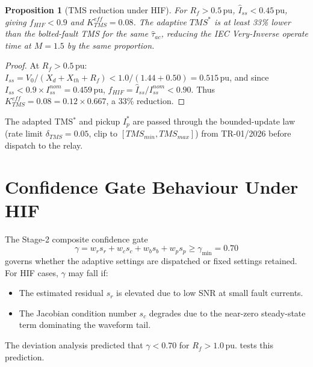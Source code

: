 \documentclass[12pt,a4paper]{article}
\theoremstyle{definition}
\theoremstyle{plain}
\newtheorem{proposition}{Proposition}[section]
\begin{document}
\begin{proposition}[TMS reduction under HIF]
\label{prop:tms_reduction}
For $R_f > 0.5\,\text{pu}$, $\hat{I}_{ss} < 0.45\,\text{pu}$, giving
$f_{HIF} < 0.9$ and $K_{TMS}^{eff} = 0.08$.  The adaptive $TMS^*$ is at
least 33\% lower than the bolted-fault TMS for the same $\hat{\tau}_{ac}$,
reducing the IEC Very-Inverse operate time at $M = 1.5$ by the same proportion.
\end{proposition}

\begin{proof}
At $R_f > 0.5\,\text{pu}$:
$I_{ss} = V_0/(X_d + X_{th} + R_f) < 1.0/(1.44 + 0.50) = 0.515\,\text{pu}$,
and since $I_{ss} < 0.9 \times I_{ss}^{nom} = 0.459\,\text{pu}$,
$f_{HIF} = \hat{I}_{ss}/I_{ss}^{nom} < 0.90$.
Thus $K_{TMS}^{eff} = 0.08 = 0.12 \times 0.667$, a 33\% reduction.
\end{proof}

The adapted TMS$^*$ and pickup $I_p^*$ are passed through the bounded-update
law (rate limit $\delta_{TMS} = 0.05$, clip to $[TMS_{min}, TMS_{max}]$) from
TR-01/2026 before dispatch to the relay.

\section{Confidence Gate Behaviour Under HIF}
\label{sec:gate}

The Stage-2 composite confidence gate \citep{TR01_2026}
\begin{equation}
  \gamma = w_r s_r + w_c s_c + w_b s_b + w_p s_p \geq \gamma_{\min} = 0.70
  \label{eq:gate:gamma}
\end{equation}
governs whether the adaptive settings are dispatched or fixed settings
retained.  For HIF cases, $\gamma$ may fall if:
\begin{itemize}
  \item The estimated residual $s_r$ is elevated due to low SNR at small
        fault currents.
  \item The Jacobian condition number $s_c$ degrades due to the near-zero
        steady-state term dominating the waveform tail.
\end{itemize}
The deviation analysis \citep{SyncOCDeviation2026} predicted that
$\gamma < 0.70$ for $R_f > 1.0\,\text{pu}$.   tests this
prediction.

\end{document}
